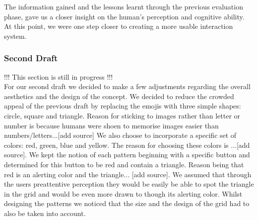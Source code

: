 The information gained and the lessons learnt through the previous evaluation phase, gave us a closer insight on the human's perception and cognitive ability. At this point, we were one step closer to creating a more usable interaction system.

\subsubsection{Second Draft}

!!! This section is still in progress !!! \\

For our second draft we decided to make a few adjustments regarding the overall aesthetics and the design of the concept. We decided to reduce the crowded appeal of the previous draft by replacing the emojis with three simple shapes: circle, square and triangle. Reason for sticking to images rather than letter or number is because humans were shoen to memorise images easier than numbers/letters...[add source] We also choose to incorporate a specific set of colors: red, green, blue and yellow. The reason for choosing these colors is ...[add source]. We kept the notion of each pattern beginning with a specific button and determined for this button to be red and contain a triangle. Reason being that red is an alerting color and the triangle... [add source]. We assumed that through the users preattentive perception they would be easily be able to spot the triangle in the grid and would be even more drawn to though its alerting color. Whilst designing the patterns we noticed that the size and the design of the grid had to also be taken into account. 


